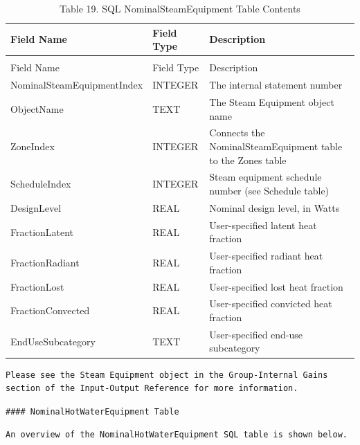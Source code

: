 \begin{longtable}[c]{p{1.5in}p{1.5in}p{2.99in}}
\caption{Table 19. SQL NominalSteamEquipment Table Contents \label{table:table-19.-sql-nominalsteamequipment-table}} \tabularnewline
\toprule 
Field Name & Field Type & Description \tabularnewline
\midrule
\endfirsthead

\caption[]{Table 19. SQL NominalSteamEquipment Table Contents} \tabularnewline
\toprule 
Field Name & Field Type & Description \tabularnewline
\midrule
\endhead

NominalSteamEquipmentIndex & INTEGER & The internal statement number \tabularnewline
ObjectName & TEXT & The Steam Equipment object name \tabularnewline
ZoneIndex & INTEGER & Connects the NominalSteamEquipment table to the Zones table \tabularnewline
ScheduleIndex & INTEGER & Steam equipment schedule number (see Schedule table) \tabularnewline
DesignLevel & REAL & Nominal design level, in Watts \tabularnewline
FractionLatent & REAL & User-specified latent heat fraction \tabularnewline
FractionRadiant & REAL & User-specified radiant heat fraction \tabularnewline
FractionLost & REAL & User-specified lost heat fraction \tabularnewline
FractionConvected & REAL & User-specified convicted heat fraction \tabularnewline
EndUseSubcategory & TEXT & User-specified end-use subcategory \tabularnewline
\bottomrule
\end{longtable}

\begin{lstlisting}
Please see the Steam Equipment object in the Group-Internal Gains section of the Input-Output Reference for more information.
\end{lstlisting}

\begin{lstlisting}
#### NominalHotWaterEquipment Table
\end{lstlisting}

\begin{lstlisting}
An overview of the NominalHotWaterEquipment SQL table is shown below.
\end{lstlisting}

